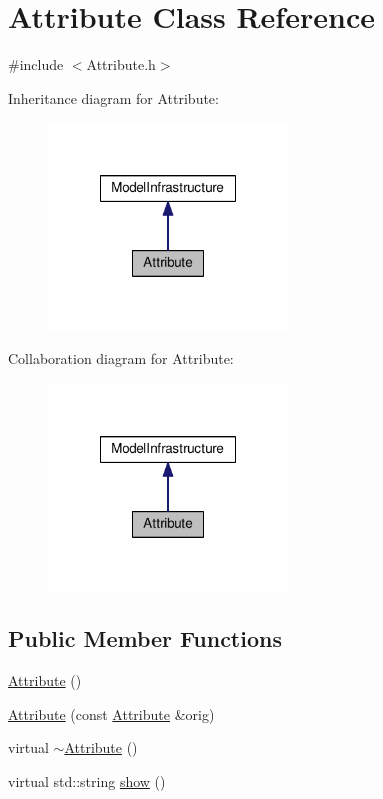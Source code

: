 \hypertarget{class_attribute}{\section{Attribute Class Reference}
\label{class_attribute}
}


{\ttfamily \#include $<$Attribute.\-h$>$}



Inheritance diagram for Attribute\-:\nopagebreak
\begin{figure}[H]
\begin{center}
\leavevmode
\includegraphics[width=180pt]{class_attribute__inherit__graph}
\end{center}
\end{figure}


Collaboration diagram for Attribute\-:\nopagebreak
\begin{figure}[H]
\begin{center}
\leavevmode
\includegraphics[width=180pt]{class_attribute__coll__graph}
\end{center}
\end{figure}
\subsection*{Public Member Functions}
\begin{DoxyCompactItemize}
\item 
\hyperlink{class_attribute_a8ba4e5a507aef352563e1e56f1930e66}{Attribute} ()
\item 
\hyperlink{class_attribute_a8a0c53bda9cc94180f06bda254809261}{Attribute} (const \hyperlink{class_attribute}{Attribute} \&orig)
\item 
virtual \hyperlink{class_attribute_a28ab087bb886728670e4ae5791bc2ea8}{$\sim$\-Attribute} ()
\item 
virtual std\-::string \hyperlink{class_attribute_aa29f79466bd6ed5e36c402ec57cb2050}{show} ()
\end{DoxyCompactItemize}
